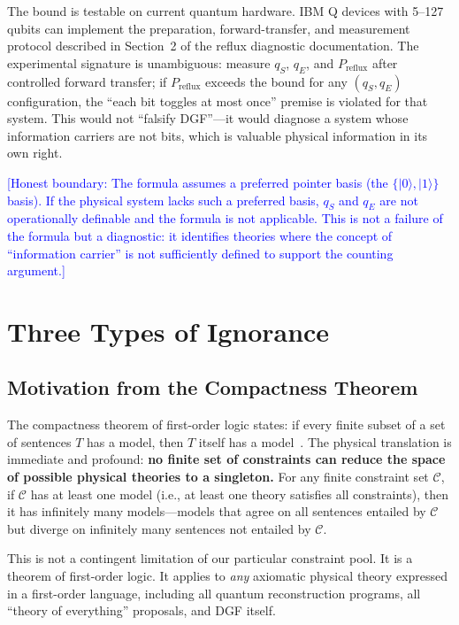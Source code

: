\documentclass[12pt,a4paper]{article}
\theoremstyle{definition}
\theoremstyle{remark}
\newcommand{\honest}[1]{\textcolor{blue}{\small [Honest boundary: #1]}}
\begin{document}
The bound is testable on current quantum hardware. IBM Q devices with 5--127 qubits can implement the preparation, forward-transfer, and measurement protocol described in Section~2 of the reflux diagnostic documentation. The experimental signature is unambiguous: measure $q_S$, $q_E$, and $P_{\mathrm{reflux}}$ after controlled forward transfer; if $P_{\mathrm{reflux}}$ exceeds the bound for any $(q_S,q_E)$ configuration, the ``each bit toggles at most once'' premise is violated for that system. This would not ``falsify DGF''---it would diagnose a system whose information carriers are not bits, which is valuable physical information in its own right.

\honest{The formula assumes a preferred pointer basis (the $\{|0\rangle,|1\rangle\}$ basis). If the physical system lacks such a preferred basis, $q_S$ and $q_E$ are not operationally definable and the formula is not applicable. This is not a failure of the formula but a diagnostic: it identifies theories where the concept of ``information carrier'' is not sufficiently defined to support the counting argument.}

\section{Three Types of Ignorance}
\label{sec:ignorance}

\subsection{Motivation from the Compactness Theorem}

The compactness theorem of first-order logic states: if every finite subset of a set of sentences $T$ has a model, then $T$ itself has a model~\cite{Marker2002,ChangKeisler1990}. The physical translation is immediate and profound: \textbf{no finite set of constraints can reduce the space of possible physical theories to a singleton.} For any finite constraint set $\mathcal{C}$, if $\mathcal{C}$ has at least one model (i.e., at least one theory satisfies all constraints), then it has infinitely many models---models that agree on all sentences entailed by $\mathcal{C}$ but diverge on infinitely many sentences not entailed by $\mathcal{C}$.

This is not a contingent limitation of our particular constraint pool. It is a theorem of first-order logic. It applies to \emph{any} axiomatic physical theory expressed in a first-order language, including all quantum reconstruction programs, all ``theory of everything'' proposals, and DGF itself.
\end{document}
